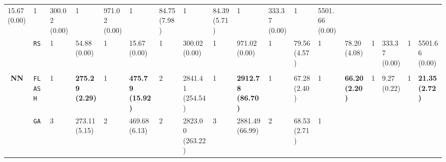 \begin{tabular}{clllllllllllllllll}
  \multicolumn{1}{l|}{\cellcolor{blue!15}15.67 (0.00)} &
  \cellcolor{blue!15}1 &
  \multicolumn{1}{l|}{\cellcolor{blue!15}300.02 (0.00)} &
  \cellcolor{blue!15}1 &
  \multicolumn{1}{l|}{\cellcolor{blue!15}971.02 (0.00)} &
  \cellcolor{blue!15}1 &
  \multicolumn{1}{l|}{\cellcolor{blue!15}84.75 (7.98)} &
  \cellcolor{blue!15}1 &
  \multicolumn{1}{l|}{\cellcolor{blue!15}84.39 (5.71)} &
  \cellcolor{blue!15}1 &
  \multicolumn{1}{l|}{\cellcolor{blue!15}333.37 (0.00)} &
  \cellcolor{blue!15}1 &
  \cellcolor{blue!15}5501.66 (0.00) \\
\multicolumn{1}{c|}{} &
  \multicolumn{1}{l|}{\texttt{RS}} &
  \cellcolor{blue!15}1 &
  \multicolumn{1}{l|}{\cellcolor{blue!15}54.88 (0.00)} &
  \cellcolor{blue!15}1 &
  \multicolumn{1}{l|}{\cellcolor{blue!15}15.67 (0.00)} &
  \cellcolor{blue!15}1 &
  \multicolumn{1}{l|}{\cellcolor{blue!15}300.02 (0.00)} &
  \cellcolor{blue!15}1 &
  \multicolumn{1}{l|}{\cellcolor{blue!15}971.02 (0.00)} &
  \cellcolor{blue!15}1 &
  \multicolumn{1}{l|}{\cellcolor{blue!15}79.56 (4.57)} &
  \cellcolor{blue!15}1 &
  \multicolumn{1}{l|}{\cellcolor{blue!15}78.20 (4.08)} &
  \cellcolor{blue!15}1 &
  \multicolumn{1}{l|}{\cellcolor{blue!15}333.37 (0.00)} &
  \cellcolor{blue!15}1 &
  \cellcolor{blue!15}5501.66 (0.00) \\
\hline
\multicolumn{1}{l}{\textbf{}} &
    &
    &
    &
    &
    &
    &
    &
    &
    &
    &
    &
    &
    &
    &
    &
    &
    \\ \hline
\multicolumn{1}{c|}{\multirow{7}{*}{\textbf{NN}}} &
  \multicolumn{1}{l|}{\texttt{FLASH}} &
  \cellcolor{blue!15}1 &
  \multicolumn{1}{l|}{\cellcolor{blue!15}\textbf{275.29 (2.29)}} &
  \cellcolor{blue!15}1 &
  \multicolumn{1}{l|}{\cellcolor{blue!15}\textbf{475.79 (15.92)}} &
  2 &
  \multicolumn{1}{l|}{2841.41 (254.54)} &
  \cellcolor{blue!15}1 &
  \multicolumn{1}{l|}{\cellcolor{blue!15}\textbf{2912.78 (86.70)}} &
  \cellcolor{blue!15}1 &
  \multicolumn{1}{l|}{\cellcolor{blue!15}67.28 (2.40)} &
  \cellcolor{blue!15}1 &
  \multicolumn{1}{l|}{\cellcolor{blue!15}\textbf{66.20 (2.20)}} &
  \cellcolor{blue!15}1 &
  \multicolumn{1}{l|}{\cellcolor{blue!15}9.27 (0.22)} &
  \cellcolor{blue!15}1 &
  \cellcolor{blue!15}\textbf{21.35 (2.72)} \\
\multicolumn{1}{c|}{} &
  \multicolumn{1}{l|}{\texttt{GA}} &
  3 &
  \multicolumn{1}{l|}{273.11 (5.15)} &
  2 &
  \multicolumn{1}{l|}{469.68 (6.13)} &
  2 &
  \multicolumn{1}{l|}{2823.00 (263.22)} &
  3 &
  \multicolumn{1}{l|}{2881.49 (66.99)} &
  2 &
  \multicolumn{1}{l|}{68.53 (2.71)} &
  \cellcolor{blue!15}1 &

\end{tabular}
